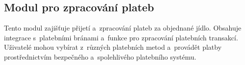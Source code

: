 	\subsection{Modul pro zpracování plateb}

	Tento modul zajišťuje přijetí a~zpracování plateb za objednané jídlo. 
	Obsahuje integrace s~platebními bránami a~funkce pro zpracování 
	platebních transakcí. Uživatelé mohou vybírat z~různých platebních 
	metod a~provádět platby prostřednictvím bezpečného a~spolehlivého 
	platebního systému.
	
\pagebreak

